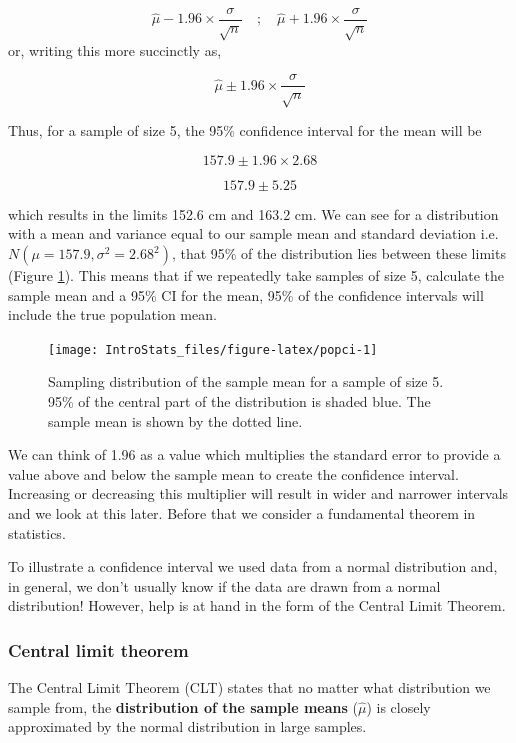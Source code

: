 \documentclass[
  oneside]{krantz}
\begin{document}
\[ \hat \mu - 1.96 \times \frac{\sigma}{\sqrt{n}} \quad ; \quad \hat \mu + 1.96 \times \frac{\sigma}{\sqrt{n}}\]
or, writing this more succinctly as,

\[ \hat \mu \pm 1.96 \times \frac{\sigma}{\sqrt{n}}\]

Thus, for a sample of size 5, the 95\% confidence interval for the mean will be

\[157.9 \pm 1.96 \times 2.68\]

\[157.9 \pm 5.25\]

which results in the limits 152.6 cm and 163.2 cm. We can see for a distribution with a mean and variance equal to our sample mean and standard deviation i.e.~\(N(\mu=157.9, \sigma^2=2.68^2)\), that 95\% of the distribution lies between these limits (Figure \ref{fig:popci}). This means that if we repeatedly take samples of size 5, calculate the sample mean and a 95\% CI for the mean, 95\% of the confidence intervals will include the true population mean.

\begin{figure}

{\centering \texttt{[image: IntroStats\_files/figure-latex/popci-1]} 

}

\caption{Sampling distribution of the sample mean for a sample of size 5. 95\% of the central part of the distribution is shaded blue. The sample mean is shown by the dotted line.}\label{fig:popci}
\end{figure}

We can think of 1.96 as a value which multiplies the standard error to provide a value above and below the sample mean to create the confidence interval. Increasing or decreasing this multiplier will result in wider and narrower intervals and we look at this later. Before that we consider a fundamental theorem in statistics.

To illustrate a confidence interval we used data from a normal distribution and, in general, we don't usually know if the data are drawn from a normal distribution! However, help is at hand in the form of the Central Limit Theorem.

\hypertarget{central-limit-theorem}{%
\subsubsection{Central limit theorem}\label{central-limit-theorem}}

The Central Limit Theorem (CLT) states that no matter what distribution we sample from, the \textbf{distribution of the sample means} (\(\hat \mu\)) is closely approximated by the normal distribution in large samples.
\end{document}
